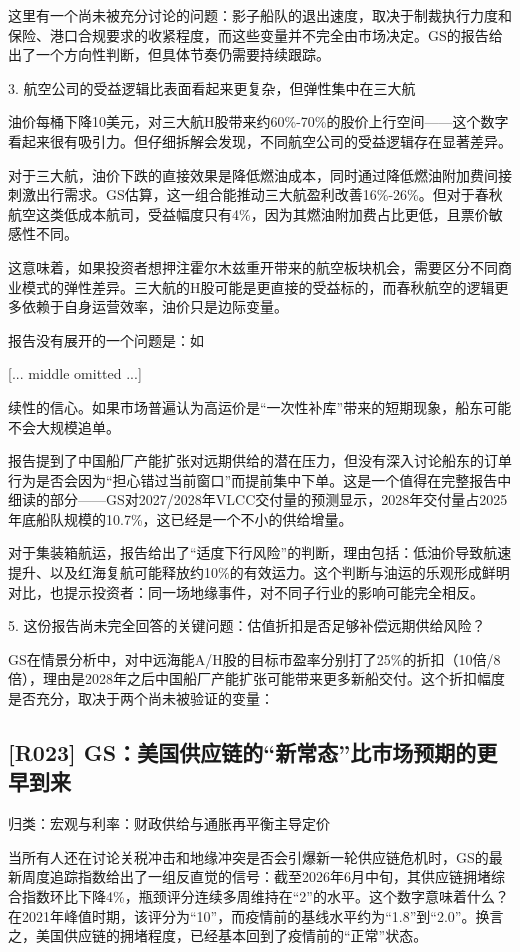 \documentclass[11pt]{ctexart}
\begin{document}
这里有一个尚未被充分讨论的问题：影子船队的退出速度，取决于制裁执行力度和保险、港口合规要求的收紧程度，而这些变量并不完全由市场决定。GS的报告给出了一个方向性判断，但具体节奏仍需要持续跟踪。

3. 航空公司的受益逻辑比表面看起来更复杂，但弹性集中在三大航

油价每桶下降10美元，对三大航H股带来约60\%-70\%的股价上行空间——这个数字看起来很有吸引力。但仔细拆解会发现，不同航空公司的受益逻辑存在显著差异。

对于三大航，油价下跌的直接效果是降低燃油成本，同时通过降低燃油附加费间接刺激出行需求。GS估算，这一组合能推动三大航盈利改善16\%-26\%。但对于春秋航空这类低成本航司，受益幅度只有4\%，因为其燃油附加费占比更低，且票价敏感性不同。

这意味着，如果投资者想押注霍尔木兹重开带来的航空板块机会，需要区分不同商业模式的弹性差异。三大航的H股可能是更直接的受益标的，而春秋航空的逻辑更多依赖于自身运营效率，油价只是边际变量。

报告没有展开的一个问题是：如

[... middle omitted ...]

续性的信心。如果市场普遍认为高运价是“一次性补库”带来的短期现象，船东可能不会大规模追单。

报告提到了中国船厂产能扩张对远期供给的潜在压力，但没有深入讨论船东的订单行为是否会因为“担心错过当前窗口”而提前集中下单。这是一个值得在完整报告中细读的部分——GS对2027/2028年VLCC交付量的预测显示，2028年交付量占2025年底船队规模的10.7\%，这已经是一个不小的供给增量。

对于集装箱航运，报告给出了“适度下行风险”的判断，理由包括：低油价导致航速提升、以及红海复航可能释放约10\%的有效运力。这个判断与油运的乐观形成鲜明对比，也提示投资者：同一场地缘事件，对不同子行业的影响可能完全相反。

5. 这份报告尚未完全回答的关键问题：估值折扣是否足够补偿远期供给风险？

GS在情景分析中，对中远海能A/H股的目标市盈率分别打了25\%的折扣（10倍/8倍），理由是2028年之后中国船厂产能扩张可能带来更多新船交付。这个折扣幅度是否充分，取决于两个尚未被验证的变量：

\subsection{[R023] GS：美国供应链的“新常态”比市场预期的更早到来}
{\small\color{refgray}归类：宏观与利率：财政供给与通胀再平衡主导定价}

当所有人还在讨论关税冲击和地缘冲突是否会引爆新一轮供应链危机时，GS的最新周度追踪指数给出了一组反直觉的信号：截至2026年6月中旬，其供应链拥堵综合指数环比下降4\%，瓶颈评分连续多周维持在“2”的水平。这个数字意味着什么？在2021年峰值时期，该评分为“10”，而疫情前的基线水平约为“1.8”到“2.0”。换言之，美国供应链的拥堵程度，已经基本回到了疫情前的“正常”状态。
\end{document}
